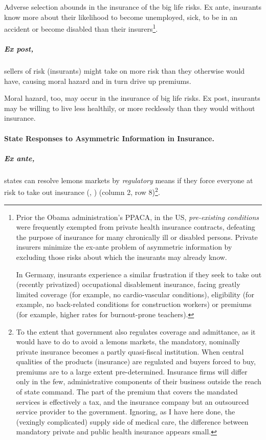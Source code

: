 Adverse selection abounds in the insurance of the big life risks. Ex ante, insurants know more about their likelihood to become unemployed, sick, to be in an accident or become disabled than their insurers\footnote{
	Prior the Obama administration's \gls{PPACA}, in the US, \emph{pre-existing conditions} were frequently exempted from private health insurance contracts, defeating the purpose of insurance for many chronically ill or disabled persons. Private insurers minimize the ex-ante problem of asymmetric information by excluding those risks about which the insurants may already know.
	 
	In Germany, insurants experience a similar frustration if they seek to take out (recently privatized) occupational disablement insurance, facing greatly limited coverage (for example, no cardio-vascular conditions), eligibility (for example, no back-related conditions for construction workers) or premiums (for example, higher rates for burnout-prone teachers).}. 

\subparagraph[Moral Hazard]{Ex post,}  \label{sec:moral-hazard} sellers of risk (insurants) might take on more risk than they otherwise would have, causing moral hazard and in turn drive up premiums. 

Moral hazard, too, may occur in the insurance of big life risks. Ex post, insurants may be willing to live less healthily, or more recklessly than they would without insurance.

\paragraph{State Responses to Asymmetric Information in Insurance.}  \label{sec:state-insurance}

\subparagraph{Ex ante,} states can resolve lemons markets by \emph{regulatory} means if they force everyone at risk to take out insurance (\citealt{Akerlof-1970-aa}, \citealt{Barr})
(column 2, row 8)\footnote{
	To the extent that government also regulates coverage and admittance, as it would have to do to avoid a lemons markets, the mandatory, nominally private insurance becomes a partly quasi-fiscal institution. When central qualities of the products (insurance) are regulated and buyers forced to buy, premiums are to a large extent pre-determined. Insurance firms will differ only in the few, administrative components of their business outside the reach of state command. The part of the premium that covers the mandated services is effectively a tax, and the insurance company but an outsourced service provider to the government. Ignoring, as I have here done, the (vexingly complicated) supply side of medical care, the difference between mandatory private and public health insurance appears small.}.

